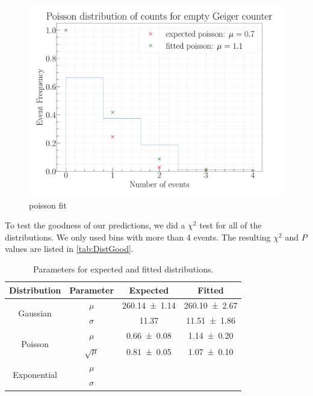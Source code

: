 \begin{figure}[H]
\centering
\includegraphics[width=\textwidth]{../Figures/Geiger_poisson_fit.pdf}
\caption{poisson fit}
\label{fig:PoissonFit}
\end{figure}

To test the goodness of our predictions, we did a $\chi^2$ test for all of the distributions. We only used bins with more than 4 events. The resulting $\chi^2$ and $P$ values are listed in \cref{tab:DistGood}.

\begin{table}[H]
	\renewcommand{\arraystretch}{1.5}
	\centering
	\begin{tabular}{|c|c|c|c|}
		\hline
		Distribution & Parameter & Expected & Fitted \\
		\hline
		\multirow{2}{*}{Gaussian} & $\mu$ & \SI{260.14 \pm 1.14}{} & \SI{260.10 \pm 2.67}{} \\
		 & $\sigma$ & \SI{11.37}{} & \SI{11.51 \pm 1.86}{} \\
		\hline
		\multirow{2}{*}{Poisson} & $\mu$ & \SI{0.66 \pm 0.08}{} & \SI{1.14 \pm 0.20}{} \\
		 & $\sqrt{\mu}$ & \SI{0.81 \pm 0,05}{} & \SI{1,07 \pm 0,10}{} \\
		\hline
		\multirow{2}{*}{Exponential} & $\mu$ & \SI{}{} & \SI{}{} \\
		 & $\sigma$ & \SI{}{} & \SI{}{} \\
		\hline
	\end{tabular}
	\caption{Parameters for expected and fitted distributions.}
	\label{tab:DistPara}
\end{table}

